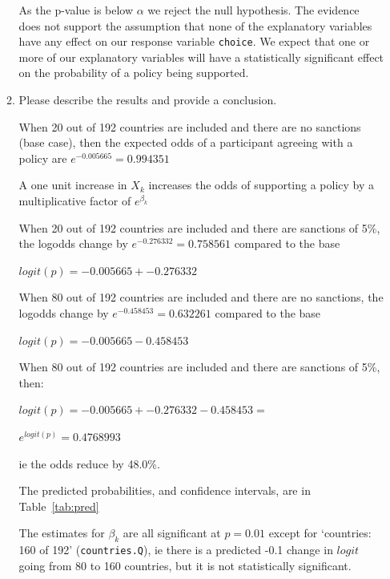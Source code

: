 \documentclass[12pt,letterpaper]{article}
\begin{document}
\begin{enumerate}
\begin{enumerate}
      As the p-value is below $\alpha$ we reject the null hypothesis.  The evidence does not support the assumption that none of the explanatory variables have any effect on our response variable \texttt{choice}.  We expect that one or more of our explanatory variables will have a statistically significant effect on the probability of a policy being supported.

			

		\item  Please describe the results and provide a conclusion.
		
		When 20 out of 192 countries are included and there are no sanctions (base case), then the expected odds of a participant agreeing with a policy are $e^{-0.005665} = 0.994351$ 
		
		A one unit increase in $X_k$ increases the odds of supporting a policy by a multiplicative factor of $e^{\beta_k}$

    When 20 out of 192 countries are included and there are sanctions of 5\%, the logodds change by $e^{-0.276332} = 0.758561$ compared to the base
    
    $logit(p) = -0.005665 + -0.276332 $

    When 80 out of 192 countries are included and there are no sanctions, the logodds change by $e^{-0.458453} = 0.632261$ compared to the base
    
    $logit(p) = -0.005665  -0.458453 $

    When 80 out of 192 countries are included and there are sanctions of 5\%, then:
  
    $logit(p) = -0.005665 + -0.276332  -0.458453 = $%
    
    $e^{logit(p)} = 0.4768993$

    ie the odds reduce by 48.0\%.
    
    
    The predicted probabilities, and confidence intervals, are in Table~\ref{tab:pred}
      
      
      The estimates for $\beta_k$ are all significant at $p=0.01$ except for  `countries: 160 of 192' (\texttt{countries.Q}), 
      ie there is a predicted -0.1 change in $logit$ going from 80 to 160 countries, but it is not statistically significant.
      

\end{enumerate}
\end{enumerate}
\end{document}
